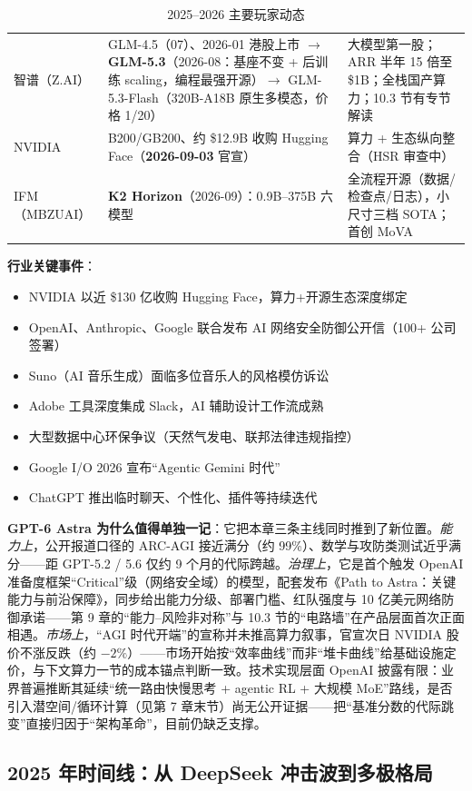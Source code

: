 \documentclass[12pt,a4paper]{article}
\begin{document}
\begin{table}[htbp]
\begin{tabular}{@{}lp{6.2cm}p{4.4cm}@{}}
智谱（Z.AI） & GLM-4.5（07）、2026-01 港股上市 $\to$ \textbf{GLM-5.3}（2026-08：基座不变 + 后训练 scaling，编程最强开源）$\to$ GLM-5.3-Flash（320B-A18B 原生多模态，价格 1/20） & 大模型第一股；ARR 半年 15 倍至 \$1B；全栈国产算力；10.3 节有专节解读\\
NVIDIA & B200/GB200、约 \$12.9B 收购 Hugging Face（\textbf{2026-09-03} 官宣） & 算力 + 生态纵向整合（HSR 审查中）\\
IFM（MBZUAI） & \textbf{K2 Horizon}（2026-09）：0.9B--375B 六模型 & 全流程开源（数据/检查点/日志），小尺寸三档 SOTA；首创 MoVA\\
\bottomrule
\end{tabular}
\caption{2025--2026 主要玩家动态}
\end{table}

\textbf{行业关键事件}：
\begin{itemize}
  \item NVIDIA 以近 \$130 亿收购 Hugging Face，算力+开源生态深度绑定
  \item OpenAI、Anthropic、Google 联合发布 AI 网络安全防御公开信（100+ 公司签署）
  \item Suno（AI 音乐生成）面临多位音乐人的风格模仿诉讼
  \item Adobe 工具深度集成 Slack，AI 辅助设计工作流成熟
  \item 大型数据中心环保争议（天然气发电、联邦法律违规指控）
  \item Google I/O 2026 宣布“Agentic Gemini 时代”
  \item ChatGPT 推出临时聊天、个性化、插件等持续迭代
\end{itemize}

\textbf{GPT-6 Astra 为什么值得单独一记}：它把本章三条主线同时推到了新位置。\emph{能力上}，公开报道口径的 ARC-AGI 接近满分（约 99\%）、数学与攻防类测试近乎满分——距 GPT-5.2 / 5.6 仅约 9 个月的代际跨越。\emph{治理上}，它是首个触发 OpenAI 准备度框架“Critical”级（网络安全域）的模型，配套发布《Path to Astra：关键能力与前沿保障》，同步给出能力分级、部署门槛、红队强度与 10 亿美元网络防御承诺——第 9 章的“能力--风险非对称”与 10.3 节的“电路墙”在产品层面首次正面相遇。\emph{市场上}，“AGI 时代开端”的宣称并未推高算力叙事，官宣次日 NVIDIA 股价不涨反跌（约 $-2\%$）——市场开始按“效率曲线”而非“堆卡曲线”给基础设施定价，与下文算力一节的成本锚点判断一致。技术实现层面 OpenAI 披露有限：业界普遍推断其延续“统一路由快慢思考 + agentic RL + 大规模 MoE”路线，是否引入潜空间/循环计算（见第 7 章末节）尚无公开证据——把“基准分数的代际跳变”直接归因于“架构革命”，目前仍缺乏支撑。

\subsection{2025 年时间线：从 DeepSeek 冲击波到多极格局}
\end{document}
